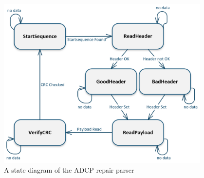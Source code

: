\begin{figure}[h]
\centering
      \includegraphics[width=0.95\textwidth]{repair}
        \caption{A state diagram of the ADCP repair parser}
\end{figure}

